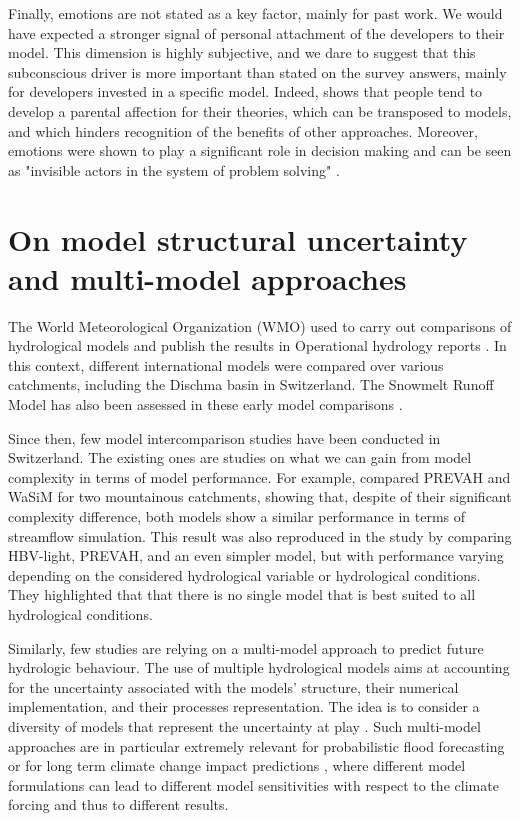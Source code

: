\documentclass[10pt,a4paper]{article}
\begin{document}
Finally, emotions are not stated as a key factor, mainly for past work. We would have expected a stronger signal of personal attachment of the developers to their model. This dimension is highly subjective, and we dare to suggest that this subconscious driver is more important than stated on the survey answers, mainly for developers invested in a specific model. Indeed, \citet{Chamberlin1890} shows that people tend to develop a parental affection for their theories, which can be transposed to models, and which hinders recognition of the benefits of other approaches. Moreover, emotions were shown to play a significant role in decision making and can be seen as "invisible actors in the system of problem solving" \citep{Hamalainen2015}.


\section{On model structural uncertainty and multi-model approaches}
\label{sec:multi-model}

The World Meteorological Organization (WMO) used to carry out comparisons of hydrological models and publish the results in Operational hydrology reports \citep{WMO1986, WMO1992a}. In this context, different international models were compared over various catchments, including the Dischma basin in Switzerland. The Snowmelt Runoff Model \citep[SRM,][see supplementary material]{Martinec1975} has also been assessed in these early model comparisons \citep{WMO1986, WMO1992a}.

Since then, few model intercomparison studies have been conducted in Switzerland. The existing ones are studies on what we can gain from model complexity in terms of model performance. For example, \citet{Gurtz2003} compared PREVAH and WaSiM for two mountainous catchments, showing that, despite of their significant complexity difference, both models show a similar performance in terms of streamflow simulation. This result was also reproduced in the study by \citet{Orth2015} comparing HBV-light, PREVAH, and an even simpler model, but with performance varying depending on the considered hydrological variable or hydrological conditions. They highlighted that that there is no single model that is best suited to all hydrological conditions.

Similarly, few studies are relying on a multi-model approach to predict future hydrologic behaviour. The use of multiple hydrological models aims at accounting for the uncertainty associated with the models' structure, their numerical implementation, and their processes representation. The idea is to consider a diversity of models that represent the uncertainty at play \citep{Babel2019}. Such multi-model approaches are in particular extremely relevant for probabilistic flood forecasting \citep{Kauffeldt2016} or for long term climate change impact predictions \citep{Kobierska2011, Kobierska2013, Andrianaki2019}, where different model formulations can lead to different model sensitivities with respect to the climate forcing and thus to different results. 
\end{document}

